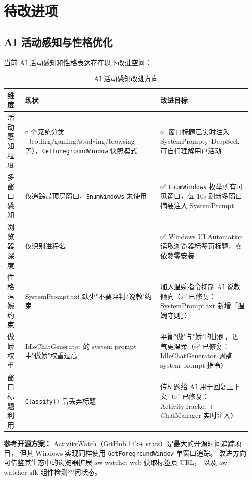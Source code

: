 \documentclass[12pt,a4paper]{ctexart}
\begin{document}
\section{待改进项}

\subsection{AI 活动感知与性格优化}

当前 AI 活动感知和性格表达存在以下改进空间：

\begin{table}[H]
\centering
\caption{AI 活动感知改进方向}
\label{tab:ai-improvements}
\begin{tabular}{p{}p{}p{}}
\toprule
\textbf{维度} & \textbf{现状} & \textbf{改进目标} \\
\midrule
活动感知粒度 & 8 个笼统分类（coding/gaming/studying/browsing 等），\texttt{GetForegroundWindow} 快照模式 & ✅ 窗口标题已实时注入 SystemPrompt，DeepSeek 可自行理解用户活动 \\
多窗口感知 & 仅追踪最顶层窗口，\texttt{EnumWindows} 未使用 & ✅ \texttt{EnumWindows} 枚举所有可见窗口，每 10s 刷新多窗口摘要注入 SystemPrompt \\
浏览器深度 & 仅识别进程名 & ✅ Windows UI Automation 读取浏览器标签页标题，零依赖零安装 \\
性格温婉约束 & SystemPrompt.txt 缺少"不要评判/说教"约束 & 加入温婉指令抑制 AI 说教倾向（✅ 已修复：SystemPrompt.txt 新增「温婉守则」） \\
傲娇权重 & IdleChatGenerator 的 system prompt 中"傲娇"权重过高 & 平衡"傲"与"娇"的比例，语气更温柔（✅ 已修复：IdleChatGenerator 调整 system prompt 指令） \\
窗口标题利用 & \texttt{Classify()} 后丢弃标题 & 传标题给 AI 用于回复上下文（✅ 已修复：ActivityTracker + ChatManager 实时注入） \\
\bottomrule
\end{tabular}
\end{table}

\textbf{参考开源方案：} \href{https://github.com/ActivityWatch/aw-watcher-window}{ActivityWatch}（GitHub 14k+ stars）是最大的开源时间追踪项目，
但其 Windows 实现同样使用 \texttt{GetForegroundWindow} 单窗口追踪。
改进方向可借鉴其生态中的浏览器扩展 aw-watcher-web 获取标签页 URL，
以及 aw-watcher-afk 组件检测空闲状态。

\end{document}
